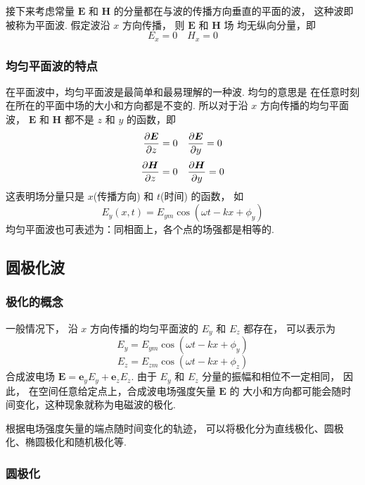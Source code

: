 \documentclass[UTF8,linespread=1.236]{ctexart}
\newcommand\cu[1]{\boldsymbol{#1}}
\newcommand\vecE{\cu{E}}
\newcommand\vecH{\cu{H}}
\newcommand\pypx[2]{{{\partial {#1}} \over {\partial {#2}}}}
\begin{document}
接下来考虑常量 $\vecE$ 和 $\vecH$ 的分量都在与波的传播方向垂直的平面的波，
这种波即被称为平面波.
假定波沿 $x$ 方向传播，
则 $\vecE$ 和 $\vecH$ 场
均无纵向分量，即
\begin{equation*}
    E_x = 0 \quad H_x = 0
\end{equation*}

\subsubsection{均匀平面波的特点}
在平面波中，均匀平面波是最简单和最易理解的一种波.
均匀的意思是
在任意时刻在所在的平面中场的大小和方向都是不变的.
所以对于沿 $x$ 方向传播的均匀平面波，
$\vecE$ 和 $\vecH$ 都不是 $z$ 和 $y$ 的函数，即
\begin{equation*}
    \pypx{\vecE}{z} = 0 \quad \pypx{\vecE}{y} = 0
\end{equation*}
\begin{equation*}
    \pypx{\vecH}{z} = 0 \quad \pypx{\vecH}{y} = 0
\end{equation*}
这表明场分量只是 $x$(传播方向) 和 $t$(时间) 的函数，
如
\begin{equation}
    E_y(x,t) = E_{ym}\cos{(\omega t - kx + \phi_y)}
\end{equation}
均匀平面波也可表述为：同相面上，各个点的场强都是相等的.

\subsection{圆极化波}

\subsubsection{极化的概念}
\newcommand\phase[1]{\omega t - kx + \phi_{#1}}
一般情况下，
沿 $x$ 方向传播的均匀平面波的 $E_y$ 和 $E_z$ 都存在，
可以表示为
\begin{equation}
    E_y = E_{ym}\cos{(\phase{y})}
\end{equation}
\begin{equation}
    E_z = E_{zm}\cos{(\phase{z})}
\end{equation}
合成波电场 $\vecE = \cu{e}_yE_y + \cu{e}_zE_z$.
由于 $E_y$ 和 $E_z$ 分量的振幅和相位不一定相同，
因此，
在空间任意给定点上，合成波电场强度矢量 $\vecE$ 的
大小和方向都可能会随时间变化，这种现象就称为电磁波的极化.

根据电场强度矢量的端点随时间变化的轨迹，
可以将极化分为直线极化、圆极化、椭圆极化和随机极化等.

\subsubsection{圆极化}
\end{document}
